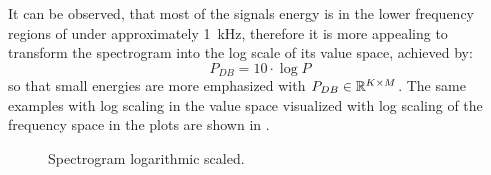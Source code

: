 \FloatBarrier
\noindent
It can be observed, that most of the signals energy is in the lower frequency regions of under approximately \SI{1}{\kilo\hertz}, therefore it is more appealing to transform the spectrogram into the log scale of its value space, achieved by:
\begin{equation}\label{eq:signal_spec_log}
  P_{DB} = 10 \cdot \log{P}
\end{equation}
so that small energies are more emphasized with $P_{DB} \in \mathbb{R}^{K \times M}$. 
The same examples with log scaling in the value space visualized with log scaling of the frequency space in the plots are shown in .
\begin{figure}[!ht]
  \centering
  \caption{Spectrogram logarithmic scaled.}
  \label{fig:signal_spec_log_showcase}
\end{figure}
